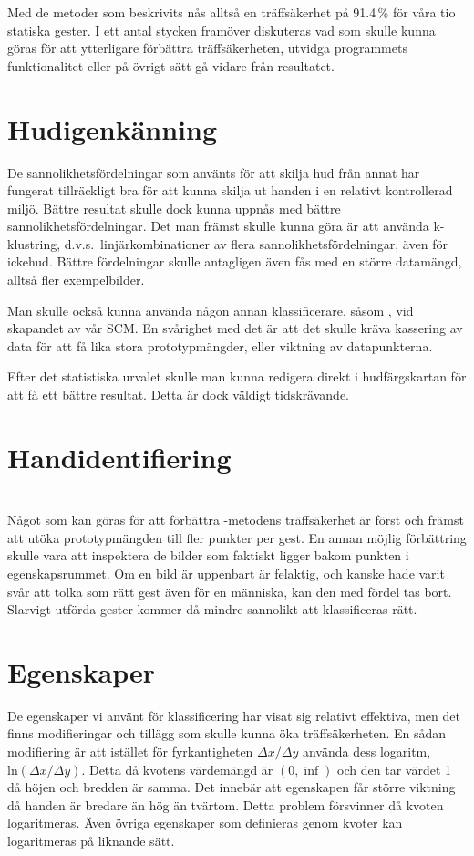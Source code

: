 \documentclass[../rapport_MVEX01-11-05]{subfiles}
\begin{document}
Med de metoder som beskrivits nås alltså en träffsäkerhet på 91.4\,\%
för våra tio statiska gester. I ett antal stycken framöver diskuteras
vad som skulle kunna göras för att ytterligare förbättra
träffsäkerheten, utvidga programmets funktionalitet eller på övrigt
sätt gå vidare från resultatet.

\section{Hudigenkänning}
De sannolikhetsfördelningar som använts för att skilja hud från annat
har fungerat tillräckligt bra för att kunna skilja ut handen i en
relativt kontrollerad miljö. Bättre resultat skulle dock kunna uppnås
med bättre sannolikhetsfördelningar. Det man främst skulle kunna göra
är att använda k-klustring, d.v.s.~linjärkombinationer av flera
sannolikhetsfördelningar, även för ickehud. Bättre fördelningar skulle
antagligen även fås med en större datamängd, alltså fler
exempelbilder.

Man skulle också kunna använda någon annan klassificerare, såsom \knn,
vid skapandet av vår SCM. En svårighet med det är att det skulle
kräva kassering av data för att få lika stora prototypmängder,
eller viktning av datapunkterna.

Efter det statistiska urvalet skulle man kunna redigera direkt i
hudfärgskartan för att få ett bättre resultat. Detta är dock väldigt
tidskrävande.

\section{Handidentifiering}

\section{\knn}
Något som kan göras för att förbättra \knn-metodens träffsäkerhet är först och
främst att utöka prototypmängden till fler punkter per gest. En annan möjlig
förbättring skulle vara att inspektera de bilder som faktiskt ligger bakom
punkten i egenskapsrummet. Om en bild är uppenbart är felaktig, och
kanske hade varit
svår att tolka som rätt gest även för en människa, kan den med fördel tas bort.
Slarvigt utförda gester kommer då mindre sannolikt att
klassificeras rätt.

\section{Egenskaper}
De egenskaper vi använt för klassificering har visat sig relativt
effektiva, men det finns modifieringar och tillägg som skulle kunna
öka träffsäkerheten.
En sådan modifiering är att istället för fyrkantigheten $\Delta
x/\Delta y$ använda dess logaritm, $\text{ln}(\Delta x/\Delta
y)$. Detta då kvotens värdemängd är $(0,\inf)$ och den tar värdet 1 då
höjen och bredden är samma. Det innebär att egenskapen får större
viktning då handen är bredare än hög än tvärtom. Detta problem
försvinner då kvoten logaritmeras. Även övriga egenskaper som
definieras genom kvoter kan logaritmeras på liknande sätt.
\end{document}
